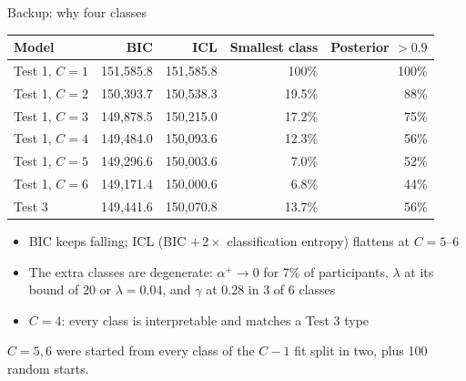 \documentclass[aspectratio=169,11pt]{beamer}
\newcommand{\ap}{\alpha^{+}}
\newcommand{\tabnote}[1]{\par\vfill{\scriptsize\color{muted}#1\par}}
\newcommand{\tight}{\setlength{\itemsep}{3pt}}
\begin{document}
\begin{frame}{Backup: why four classes}
{\centering\footnotesize
\begin{tabular}{l rrrr}
\toprule
Model & BIC & ICL & Smallest class & Posterior $>0.9$\\
\midrule
Test 1, $C=1$ & 151{,}585.8 & 151{,}585.8 & 100\% & 100\%\\
Test 1, $C=2$ & 150{,}393.7 & 150{,}538.3 & 19.5\% & 88\%\\
Test 1, $C=3$ & 149{,}878.5 & 150{,}215.0 & 17.2\% & 75\%\\
Test 1, $C=4$ & 149{,}484.0 & 150{,}093.6 & 12.3\% & 56\%\\
Test 1, $C=5$ & 149{,}296.6 & 150{,}003.6 & 7.0\% & 52\%\\
Test 1, $C=6$ & 149{,}171.4 & 150{,}000.6 & 6.8\% & 44\%\\
\midrule
Test 3 & 149{,}441.6 & 150{,}070.8 & 13.7\% & 56\%\\
\bottomrule
\end{tabular}\par}
\begin{itemize}\small\tight
  \item BIC keeps falling; ICL (BIC $+\,2\times$ classification entropy) flattens at $C=5$--$6$
  \item The extra classes are degenerate: $\ap\to 0$ for 7\% of participants, $\lambda$ at its bound of 20 or $\lambda=0.04$, and $\gamma$ at 0.28 in 3 of 6 classes
  \item $C=4$: every class is interpretable and matches a Test 3 type
\end{itemize}
\tabnote{$C=5,6$ were started from every class of the $C-1$ fit split in two, plus 100 random starts.}
\end{frame}
\end{document}
